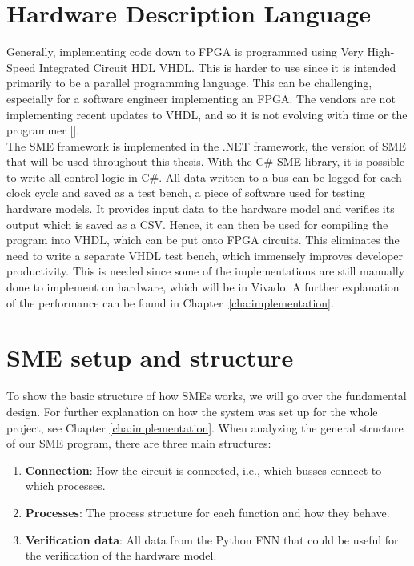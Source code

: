 \section{Hardware Description Language}
Generally, implementing code down to \acrshort{FPGA} is programmed using Very High-Speed Integrated Circuit HDL \acrshort{VHDL}. This is harder to use since it is intended primarily to be a parallel programming language. This can be challenging, especially for a software engineer implementing an FPGA.
The vendors are not implementing recent updates to VHDL, and so it is not evolving with time or the programmer [\cite{SME2020}]. \\

The SME framework is implemented in the .NET framework, the version of SME that will be used throughout this thesis.
With the C\# SME library, it is possible to write all control logic in C\#.
All data written to a bus can be logged for each clock cycle and saved as a test bench, a piece of software used for
testing hardware models. It provides input data to the hardware model and verifies its output which is saved as a \acrshort{CSV}. Hence, it can then be used for compiling the program into VHDL, which can be put onto FPGA circuits. This eliminates the need to write a separate VHDL test bench, which immensely improves developer productivity. This is needed since some of the implementations are still manually done to implement on hardware, which will be in Vivado. A further explanation of the performance can be found in Chapter~\ref{cha:implementation}.




\section{SME setup and structure}

To show the basic structure of how SMEs works, we will go over the fundamental design. For further explanation on how the system was set up for the whole project, see Chapter \ref{cha:implementation}.
When analyzing the general structure of our SME program, there are three main structures:
\begin{enumerate}
    \item \textbf{Connection}: How the circuit is connected, i.e., which busses connect to which processes.
    \item \textbf{Processes}: The process structure for each function and how they behave.
    \item \textbf{Verification data}: All data from the Python FNN that could be useful for the verification of the hardware model.
\end{enumerate}




